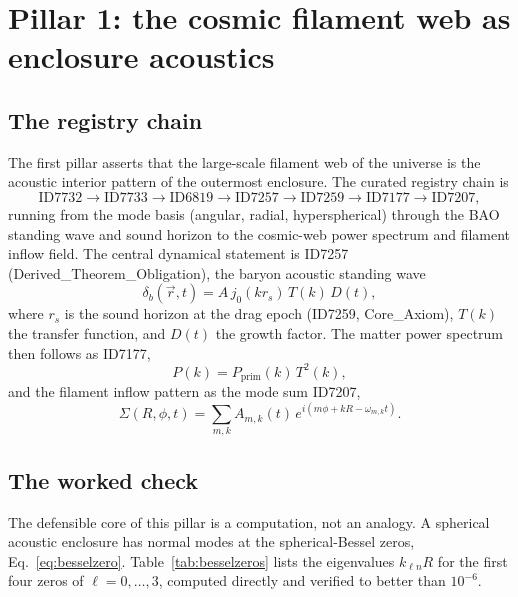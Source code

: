 \documentclass[11pt]{article}
\theoremstyle{remark}
\begin{document}
\section{Pillar 1: the cosmic filament web as enclosure acoustics}
\label{sec:pillar1}

\subsection{The registry chain}

The first pillar asserts that the large-scale filament web of the universe is the acoustic interior pattern of the outermost enclosure. The curated registry chain is
\begin{equation*}
\text{ID7732} \to \text{ID7733} \to \text{ID6819} \to \text{ID7257} \to \text{ID7259} \to \text{ID7177} \to \text{ID7207},
\end{equation*}
running from the mode basis (angular, radial, hyperspherical) through the BAO standing wave and sound horizon to the cosmic-web power spectrum and filament inflow field. The central dynamical statement is ID7257 (Derived\_Theorem\_Obligation), the baryon acoustic standing wave
\begin{equation}
\delta_b(\vec{r},t) = A\, j_0(k r_s)\, T(k)\, D(t),
\label{eq:bao}
\end{equation}
where $r_s$ is the sound horizon at the drag epoch (ID7259, Core\_Axiom), $T(k)$ the transfer function, and $D(t)$ the growth factor. The matter power spectrum then follows as ID7177,
\begin{equation}
P(k) = P_{\mathrm{prim}}(k)\, T^2(k),
\end{equation}
and the filament inflow pattern as the mode sum ID7207,
\begin{equation}
\Sigma(R,\phi,t) = \sum_{m,k} A_{m,k}(t)\, e^{i(m\phi + kR - \omega_{m,k} t)}.
\end{equation}

\subsection{The worked check}

The defensible core of this pillar is a computation, not an analogy. A spherical acoustic enclosure has normal modes at the spherical-Bessel zeros, Eq.~\eqref{eq:besselzero}. Table~\ref{tab:besselzeros} lists the eigenvalues $k_{\ell n}R$ for the first four zeros of $\ell = 0,\dots,3$, computed directly and verified to better than $10^{-6}$.
\end{document}

